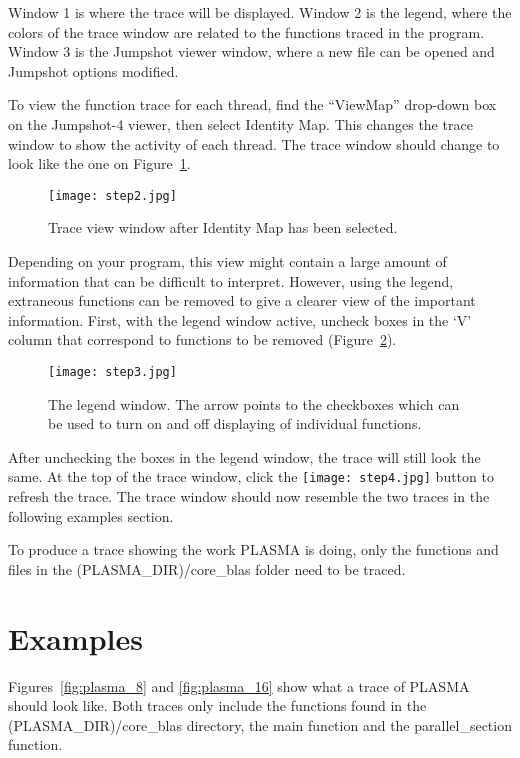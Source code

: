 \documentclass[11pt,letterpaper]{article}
\begin{document}
Window 1 is where the trace will be displayed. Window 2 is the legend, where the colors of the trace window are related to the functions traced in the program. Window 3 is the Jumpshot viewer window, where a new file can be opened and Jumpshot options modified.

To view the function trace for each thread, find the ``ViewMap'' drop-down box on the Jumpshot-4 viewer, then select Identity Map. This changes the trace window to show the activity of each thread. The trace window should change to look like the one on Figure~\ref{fig:trace_window}.

\begin{figure}
\centering
\texttt{[image: step2.jpg]}
\caption{Trace view window after Identity Map has been selected.}
\label{fig:trace_window}
\end{figure}

Depending on your program, this view might contain a large amount of information that can be difficult to interpret. However, using the legend, extraneous functions can be removed to give a clearer view of the important information. First, with the legend window active, uncheck boxes in the `V' column that correspond to functions to be removed (Figure~\ref{fig:checkboxes}).

\begin{figure}
\centering
\texttt{[image: step3.jpg]}
\caption{The legend window. The arrow points to the checkboxes which can be used to turn on and off
         displaying of individual functions.}
\label{fig:checkboxes}
\end{figure}

After unchecking the boxes in the legend window, the trace will still look the same. At the top of the trace window, click the \texttt{[image: step4.jpg]} button to refresh the trace. The trace window should now resemble the two traces in the following examples section.

To produce a trace showing the work PLASMA is doing, only the functions and files in the (PLASMA\_DIR)/core\_blas folder need to be traced.


\section{Examples}
Figures~\ref{fig:plasma_8} and \ref{fig:plasma_16} show what a trace of PLASMA should look like. Both traces only include the functions found in the (PLASMA\_DIR)/core\_blas directory, the main function and the parallel\_section function.
\end{document}
